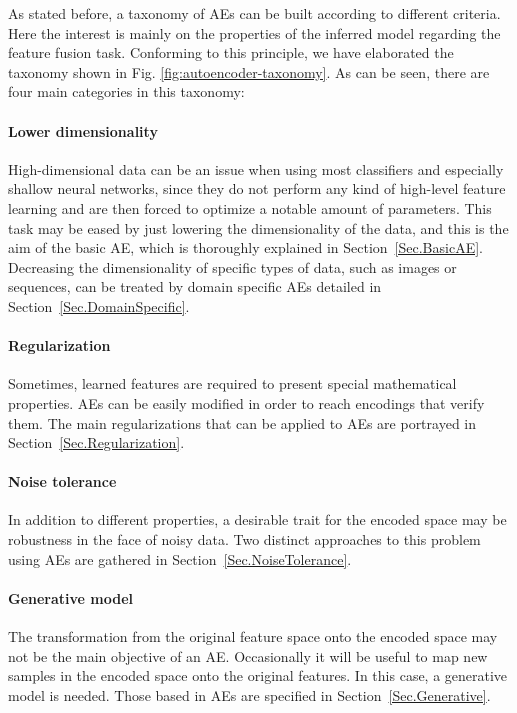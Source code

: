 \documentclass[preprint,5p,compress]{elsarticle}
\begin{document}
As stated before, a taxonomy of AEs can be built according to different criteria. Here the interest is mainly on the properties of the inferred model regarding the feature fusion task. Conforming to this principle, we have elaborated the taxonomy shown in Fig. \ref{fig:autoencoder-taxonomy}. As can be seen, there are four main categories in this taxonomy:

\paragraph{Lower dimensionality}
High-dimensional data can be an issue when using most classifiers and especially shallow neural networks, since they do not perform any kind of high-level feature learning and are then forced to optimize a notable amount of parameters. This task may be eased by just lowering the dimensionality of the data, and this is the aim of the basic AE, which is thoroughly explained in Section~\ref{Sec.BasicAE}. Decreasing the dimensionality of specific types of data, such as images or sequences, can be treated by domain specific AEs detailed in Section~\ref{Sec.DomainSpecific}.

\paragraph{Regularization}
Sometimes, learned features are required to present special mathematical properties. AEs can be easily modified in order to reach encodings that verify them. The main regularizations that can be applied to AEs are portrayed in Section~\ref{Sec.Regularization}.

\paragraph{Noise tolerance}
In addition to different properties, a desirable trait for the encoded space may be robustness in the face of noisy data. Two distinct approaches to this problem using AEs are gathered in Section~\ref{Sec.NoiseTolerance}.

\paragraph{Generative model}
The transformation from the original feature space onto the encoded space may not be the main objective of an AE. Occasionally it will be useful to map new samples in the encoded space onto the original features. In this case, a generative model is needed. Those based in AEs are specified in Section~\ref{Sec.Generative}.
\end{document}
